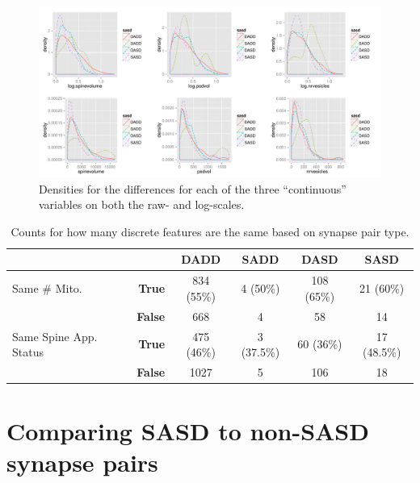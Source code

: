 \documentclass[12pt]{article}
\theoremstyle{definition}
\begin{document}
\begin{figure}[tb]
  \begin{center}
    \includegraphics[width=\textwidth]{./Figures/sasdDensityPlots.pdf}
  \end{center}
  \caption{Densities for the differences for each of the three ``continuous'' variables on both the raw- and log-scales. }
  \label{fig:density}
\end{figure}

\begin{table}[tb]
  \label{tab:discreteCounts}
  \begin{center}
    \begin{tabular}{l|rcccc}
    \hline
                       &                & \textbf{DADD} & \textbf{SADD} & \textbf{DASD} & \textbf{SASD} \\ \hline
Same \# Mito.          & \textbf{True}  & 834 (55\%)          & 4   (50\%)          & 108   (65\%)        & 21 (60\%) \\
                       & \textbf{False} & 668           & 4             & 58            & 14 \\\hline
Same Spine App. Status & \textbf{True}  & 475  (46\%)         & 3  (37.5\%)         & 60  (36\%)         & 17 (48.5\%) \\
& \textbf{False}       & 1027           & 5             & 106           & 18 \\
    \hline
    \end{tabular}
  \end{center}
  \caption{Counts for how many discrete features are the same based on synapse pair type. }
\end{table}

\section{Comparing SASD to non-SASD synapse pairs}
  
\end{document}
